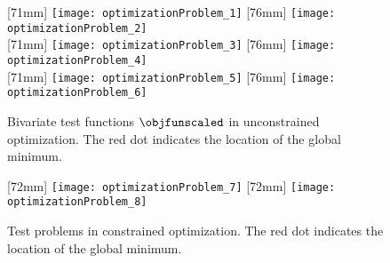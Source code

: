 \begin{figure}
  [71mm]{%
    \texttt{[image: optimizationProblem\_1]}%
  }%
  \hfill%
  [76mm]{%
    \texttt{[image: optimizationProblem\_2]}%
  }\\[2.5mm]%
  [71mm]{%
    \texttt{[image: optimizationProblem\_3]}%
  }%
  \hfill%
  [76mm]{%
    \texttt{[image: optimizationProblem\_4]}%
  }\\[2.5mm]%
  [71mm]{%
    \texttt{[image: optimizationProblem\_5]}%
  }%
  \hfill%
  [76mm]{%
    \texttt{[image: optimizationProblem\_6]}%
  }%
  \caption[%
    Unconstrained test problems%
  ]{%
    Bivariate test functions $\objfunscaled$ in unconstrained optimization.
    The \textcolor{C1}{red dot} indicates the location of the
    global minimum.%
  }%
  \label{fig:unconstrainedOptimizationProblem}%
\end{figure}

\begin{figure}
  [72mm]{%
    \texttt{[image: optimizationProblem\_7]}%
  }%
  \hfill%
  [72mm]{%
    \texttt{[image: optimizationProblem\_8]}%
  }%
  \caption[%
    Constrained test problems%
  ]{%
    Test problems in constrained optimization.
    The \textcolor{C1}{red dot} indicates the location of the
    global minimum.%
  }%
  \label{fig:constrainedOptimizationProblem}%
\end{figure}

